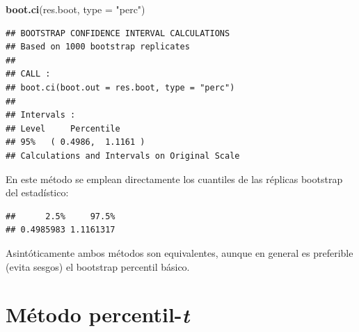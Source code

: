 \documentclass[]{book}
\newenvironment{Shaded}{\begin{snugshade}}{\end{snugshade}}
\newcommand{\KeywordTok}[1]{\textcolor[rgb]{0.13,0.29,0.53}{\textbf{#1}}}
\newcommand{\DataTypeTok}[1]{\textcolor[rgb]{0.13,0.29,0.53}{#1}}
\newcommand{\DecValTok}[1]{\textcolor[rgb]{0.00,0.00,0.81}{#1}}
\newcommand{\StringTok}[1]{\textcolor[rgb]{0.31,0.60,0.02}{#1}}
\newcommand{\CommentTok}[1]{\textcolor[rgb]{0.56,0.35,0.01}{\textit{#1}}}
\newcommand{\OperatorTok}[1]{\textcolor[rgb]{0.81,0.36,0.00}{\textbf{#1}}}
\newcommand{\NormalTok}[1]{#1}
\theoremstyle{definition}
\theoremstyle{definition}
\theoremstyle{definition}
\theoremstyle{remark}
\begin{document}
\begin{Shaded}
\begin{Highlighting}[]
\KeywordTok{boot.ci}\NormalTok{(res.boot, }\DataTypeTok{type =} \StringTok{"perc"}\NormalTok{)}
\end{Highlighting}
\end{Shaded}

\begin{verbatim}
## BOOTSTRAP CONFIDENCE INTERVAL CALCULATIONS
## Based on 1000 bootstrap replicates
## 
## CALL : 
## boot.ci(boot.out = res.boot, type = "perc")
## 
## Intervals : 
## Level     Percentile     
## 95%   ( 0.4986,  1.1161 )  
## Calculations and Intervals on Original Scale
\end{verbatim}

En este método se emplean directamente los cuantiles de las réplicas
bootstrap del estadístico:

\begin{Shaded}
\end{Shaded}

\begin{verbatim}
##      2.5%     97.5% 
## 0.4985983 1.1161317
\end{verbatim}

Asintóticamente ambos métodos son equivalentes, aunque en general es
preferible (evita sesgos) el bootstrap percentil básico.

\section{\texorpdfstring{Método
percentil-\emph{t}}{Método percentil-t}}\label{cap5-perc-t}
\end{document}
